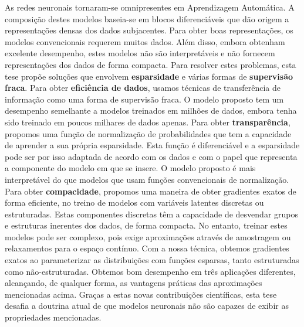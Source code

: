 \begin{resumo}

    \noindent As redes neuronais tornaram-se omnipresentes em Aprendizagem
    Automática. A composição destes modelos baseia-se em blocos
    diferenciáveis que dão origem a representações densas dos dados
    subjacentes. Para obter boas representações, os modelos
    convencionais requerem muitos dados. Além disso, embora obtenham
    excelente desempenho, estes modelos não são interpretáveis e não
    fornecem representações dos dados de forma compacta. Para
    resolver estes problemas, esta tese propõe soluções que envolvem
    \textbf{esparsidade} e várias formas de \textbf{supervisão
        fraca}. Para obter \textbf{eficiência de dados}, usamos técnicas
    de transferência de informação como uma forma de supervisão
    fraca. O modelo proposto tem um desempenho semelhante a modelos
    treinados em milhões de dados, embora tenha sido treinado em
    poucos milhares de dados apenas. Para obter
    \textbf{transparência}, propomos uma função de normalização de
    probabilidades que tem a capacidade de aprender a sua própria
    esparsidade. Esta função é diferenciável e a esparsidade pode ser
    por isso adaptada de acordo com os dados e com o papel que
    representa a componente do modelo em que se insere. O modelo
    proposto é mais interpretável do que modelos que usam funções
    convencionais de normalização. Para obter \textbf{compacidade},
    propomos uma maneira de obter gradientes exatos de forma
    eficiente, no treino de modelos com variáveis latentes discretas
    ou estruturadas. Estas componentes discretas têm a capacidade de
    desvendar grupos e estruturas inerentes dos dados, de forma
    compacta. No entanto, treinar estes modelos pode ser complexo,
    pois exige aproximações através de amostragem ou relaxamentos
    para o espaço contínuo. Com a nossa técnica, obtemos gradientes
    exatos ao parameterizar as distribuições com funções esparsas,
    tanto estruturadas como não-estruturadas. Obtemos bom
    desempenho em três aplicações diferentes, alcançando, de qualquer
    forma, as vantagens práticas das aproximações mencionadas acima.
    Graças a estas novas contribuições científicas, esta tese desafia
    a doutrina atual de que modelos neuronais não são capazes de
    exibir as propriedades mencionadas.



\end{resumo}
